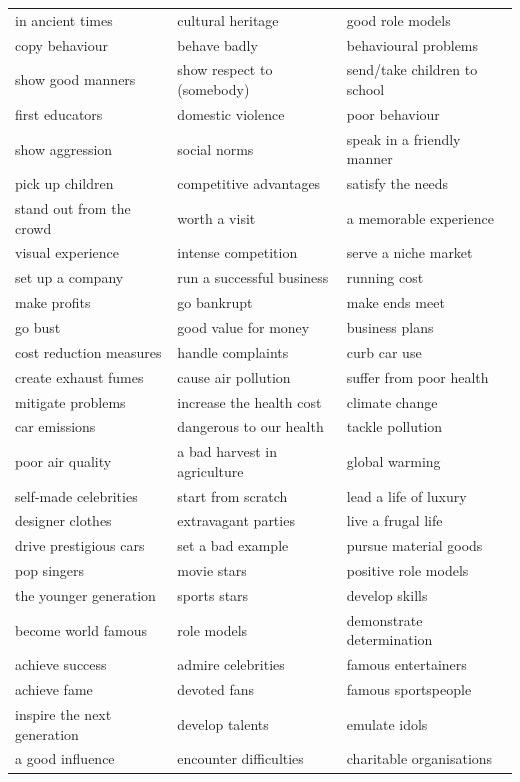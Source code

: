 \documentclass[10pt,a4paper]{article}
\begin{document}
{\begin{longtable}{@{}*{3}{p{}}@{}}
in ancient times & cultural heritage & good role models \\
copy behaviour & behave badly & behavioural problems \\
show good manners & show respect to (somebody) & send/take children to school \\
first educators & domestic violence & poor behaviour \\
show aggression & social norms & speak in a friendly manner \\
pick up children & competitive advantages & satisfy the needs \\
stand out from the crowd & worth a visit & a memorable experience \\
visual experience & intense competition & serve a niche market \\
set up a company & run a successful business & running cost \\
make profits & go bankrupt & make ends meet \\
go bust & good value for money & business plans \\
cost reduction measures & handle complaints & curb car use \\
create exhaust fumes & cause air pollution & suffer from poor health \\
mitigate problems & increase the health cost & climate change \\
car emissions & dangerous to our health & tackle pollution \\
poor air quality & a bad harvest in agriculture & global warming \\
self-made celebrities & start from scratch & lead a life of luxury \\
designer clothes & extravagant parties & live a frugal life \\
drive prestigious cars & set a bad example & pursue material goods \\
pop singers & movie stars & positive role models \\
the younger generation & sports stars & develop skills \\
become world famous & role models & demonstrate determination \\
achieve success & admire celebrities & famous entertainers \\
achieve fame & devoted fans & famous sportspeople \\
inspire the next generation & develop talents & emulate idols \\
a good influence & encounter difficulties & charitable organisations \\

\end{longtable}}
\end{document}
